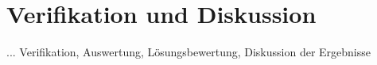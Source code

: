 \chapter{Verifikation und Diskussion}
\label{cha:Verifikation}

... Verifikation, Auswertung, Lösungsbewertung, Diskussion der Ergebnisse

